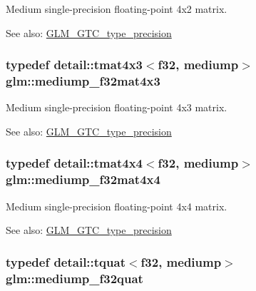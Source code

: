 Medium single-precision floating-point 4x2 matrix. \begin{Desc}
\item[See also:]\hyperlink{group__gtc__type__precision}{GLM\_\-GTC\_\-type\_\-precision} \end{Desc}
\hypertarget{group__gtc__type__precision_g31635d753ab8a19fdaa80d2b89e90c54}{
\subsubsection[mediump\_\-f32mat4x3]{\setlength{\rightskip}{0pt plus 5cm}typedef detail::tmat4x3$<$f32, mediump$>$ {\bf glm::mediump\_\-f32mat4x3}}}
\label{group__gtc__type__precision_g31635d753ab8a19fdaa80d2b89e90c54}


Medium single-precision floating-point 4x3 matrix. \begin{Desc}
\item[See also:]\hyperlink{group__gtc__type__precision}{GLM\_\-GTC\_\-type\_\-precision} \end{Desc}
\hypertarget{group__gtc__type__precision_g8f83086fffe71f9cd15e75a1de101ba6}{
\subsubsection[mediump\_\-f32mat4x4]{\setlength{\rightskip}{0pt plus 5cm}typedef detail::tmat4x4$<$f32, mediump$>$ {\bf glm::mediump\_\-f32mat4x4}}}
\label{group__gtc__type__precision_g8f83086fffe71f9cd15e75a1de101ba6}


Medium single-precision floating-point 4x4 matrix. \begin{Desc}
\item[See also:]\hyperlink{group__gtc__type__precision}{GLM\_\-GTC\_\-type\_\-precision} \end{Desc}
\hypertarget{group__gtc__type__precision_gb038e3482ca401bca2b2634c96f44f09}{
\subsubsection[mediump\_\-f32quat]{\setlength{\rightskip}{0pt plus 5cm}typedef detail::tquat$<$f32, mediump$>$ {\bf glm::mediump\_\-f32quat}}}
\label{group__gtc__type__precision_gb038e3482ca401bca2b2634c96f44f09}


